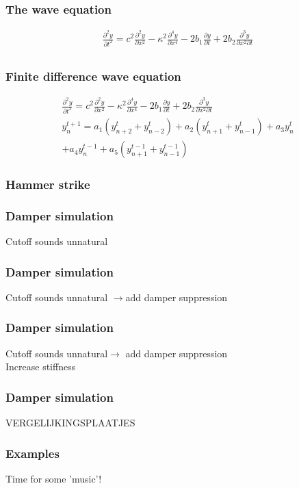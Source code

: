 \documentclass{beamer}
\begin{document}
\begin{frame}\frametitle{The wave equation}
	\begin{gather*}
	\frac{\partial^2 y}{\partial t^2} = c^2\frac{\partial^2 y}{\partial x^2}-\kappa^2\frac{\partial^4y}{\partial x^4}-2b_1\frac{\partial y}{\partial t} + 2b_2 \frac{\partial^3y}{\partial x^2\partial t}\\
\end{gather*}
\end{frame}

\begin{frame}\frametitle{Finite difference wave equation}
	\begin{gather*}
	\frac{\partial^2 y}{\partial t^2} = c^2\frac{\partial^2 y}{\partial x^2}-\kappa^2\frac{\partial^4y}{\partial x^4}-2b_1\frac{\partial y}{\partial t} + 2b_2 \frac{\partial^3y}{\partial x^2\partial t}\\
y_n^{t+1} = a_1\left(y_{n+2}^t+y_{n-2}^t\right)+a_2\left(y_{n+1}^t+y_{n-1}^t\right)+a_3y_n^t\\
+a_4y_n^{t-1}+a_5\left(y_{n+1}^{t-1}+y_{n-1}^{t-1}\right)
\end{gather*}
\end{frame}

\begin{frame}\frametitle{Hammer strike}

\end{frame}



\begin{frame}\frametitle{Damper simulation}
Cutoff sounds unnatural
\end{frame}

\begin{frame}\frametitle{Damper simulation}
Cutoff sounds unnatural $\rightarrow$add damper suppression
\end{frame}

\begin{frame}\frametitle{Damper simulation}
Cutoff sounds unnatural$\rightarrow$ add damper suppression\\
Increase stiffness
\end{frame}

\begin{frame}\frametitle{Damper simulation}
VERGELIJKINGSPLAATJES
\end{frame}



\begin{frame}\frametitle{Examples}
Time for some 'music'!
\end{frame}
\end{document}
